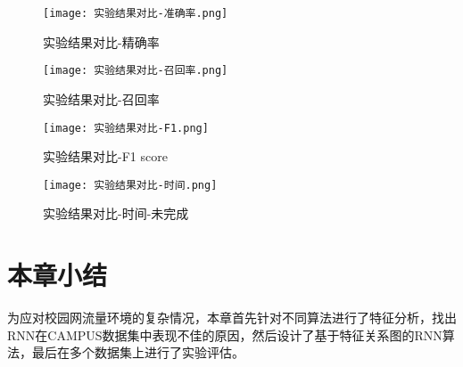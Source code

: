   \begin{figure}[htbp]
    \centering
    \begin{minipage}[t]{0.48\textwidth}
    \centering
    \texttt{[image: 实验结果对比-准确率.png]}
    \caption{实验结果对比-精确率}
    \end{minipage}
    \begin{minipage}[t]{0.48\textwidth}
    \centering
    \texttt{[image: 实验结果对比-召回率.png]}
    \caption{实验结果对比-召回率}
    \end{minipage}
    \end{figure}

    \begin{figure}[htbp]
      \centering
      \begin{minipage}[t]{0.48\textwidth}
      \centering
      \texttt{[image: 实验结果对比-F1.png]}
      \caption{实验结果对比-F1 score}
      \end{minipage}
      \begin{minipage}[t]{0.48\textwidth}
      \centering
      \texttt{[image: 实验结果对比-时间.png]}
      \caption{实验结果对比-时间-未完成}
      \end{minipage}
      \end{figure}

\section{本章小结}
为应对校园网流量环境的复杂情况，本章首先针对不同算法进行了特征分析，找出RNN在CAMPUS数据集中表现不佳的原因，然后设计了基于特征关系图的RNN算法，最后在多个数据集上进行了实验评估。



